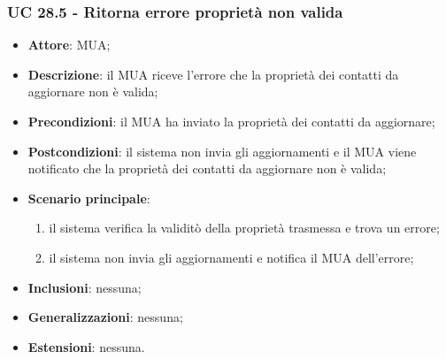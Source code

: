     \subsubsection{UC 28.5 - Ritorna errore proprietà non valida} \label{sec:UC28.5}
    \begin{itemize}
        \item \textbf{Attore}: MUA;
        \item \textbf{Descrizione}: il MUA riceve l'errore che la proprietà dei contatti da aggiornare non è valida;
        \item \textbf{Precondizioni}: il MUA ha inviato la proprietà dei contatti da aggiornare;
        \item \textbf{Postcondizioni}: il sistema non invia gli aggiornamenti e il MUA viene notificato che la proprietà dei contatti da aggiornare non è valida;
        \item \textbf{Scenario principale}:
            \begin{enumerate}
                \item il sistema verifica la validitò della proprietà trasmessa e trova un errore;
                \item il sistema non invia gli aggiornamenti e notifica il MUA dell'errore;
            \end{enumerate}
        \item \textbf{Inclusioni}: nessuna;
        \item \textbf{Generalizzazioni}: nessuna;
        \item \textbf{Estensioni}: nessuna.
    \end{itemize}